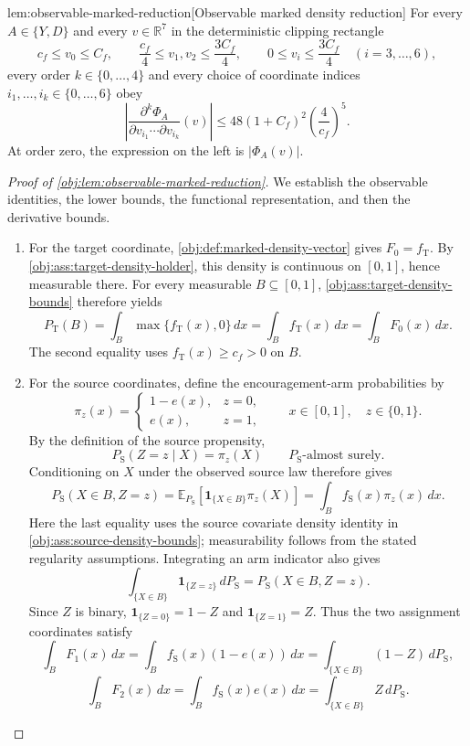 \documentclass[11pt]{article}
\begin{document}
\begin{lemmav}{lem:observable-marked-reduction}[Observable marked density reduction]
For every \(A\in\{Y,D\}\) and every \(v\in\mathbb R^7\) in the deterministic clipping rectangle
\[
c_f\le v_0\le C_f,\qquad
\frac{c_f}{4}\le v_1,v_2\le\frac{3C_f}{4},\qquad
0\le v_i\le\frac{3C_f}{4}\quad(i=3,\ldots,6),
\]
every order \(k\in\{0,\ldots,4\}\) and every choice of coordinate indices \(i_1,\ldots,i_k\in\{0,\ldots,6\}\) obey
\[
\left|
\frac{\partial^k\Phi_A}{\partial v_{i_1}\cdots\partial v_{i_k}}(v)
\right|
\le
48(1+C_f)^2\left(\frac{4}{c_f}\right)^5.
\]
At order zero, the expression on the left is \(\lvert\Phi_A(v)\rvert\).
\end{lemmav}

\begin{proof}[Proof of \cref{obj:lem:observable-marked-reduction}]
We establish the observable identities, the lower bounds, the functional representation, and then the derivative bounds.

\begin{enumerate}
\item For the target coordinate, \cref{obj:def:marked-density-vector} gives \(F_0=f_{\mathrm T}\). By \cref{obj:ass:target-density-holder}, this density is continuous on \([0,1]\), hence measurable there. For every measurable \(B\subseteq[0,1]\), \cref{obj:ass:target-density-bounds} therefore yields
\[
P_{\mathrm T}(B)
=\int_B\max\{f_{\mathrm T}(x),0\}\,dx
=\int_B f_{\mathrm T}(x)\,dx
=\int_B F_0(x)\,dx.
\]
The second equality uses \(f_{\mathrm T}(x)\ge c_f>0\) on \(B\).

\item For the source coordinates, define the encouragement-arm probabilities by
\[
\pi_z(x)=
\begin{cases}
1-e(x),&z=0,\\
e(x),&z=1,
\end{cases}
\qquad x\in[0,1],\quad z\in\{0,1\}.
\]
By the definition of the source propensity,
\[
P_{\mathrm S}(Z=z\mid X)=\pi_z(X)
\qquad P_{\mathrm S}\text{-almost surely}.
\]
Conditioning on \(X\) under the observed source law therefore gives
\[
P_{\mathrm S}(X\in B,Z=z)
=
\mathbb E_{P_{\mathrm S}}\!\left[
\mathbf 1_{\{X\in B\}}\pi_z(X)
\right]
=
\int_B f_{\mathrm S}(x)\pi_z(x)\,dx.
\]
Here the last equality uses the source covariate density identity in
\cref{obj:ass:source-density-bounds}; measurability follows from the stated regularity assumptions. Integrating an arm indicator also gives
\[
\int_{\{X\in B\}}\mathbf 1_{\{Z=z\}}\,dP_{\mathrm S}
=P_{\mathrm S}(X\in B,Z=z).
\]
Since \(Z\) is binary, \(\mathbf 1_{\{Z=0\}}=1-Z\) and
\(\mathbf 1_{\{Z=1\}}=Z\). Thus the two assignment coordinates satisfy
\[
\int_B F_1(x)\,dx
=\int_B f_{\mathrm S}(x)(1-e(x))\,dx
=\int_{\{X\in B\}}(1-Z)\,dP_{\mathrm S},
\]
\[
\int_B F_2(x)\,dx
=\int_B f_{\mathrm S}(x)e(x)\,dx
=\int_{\{X\in B\}}Z\,dP_{\mathrm S}.
\]


\end{enumerate}
\end{proof}
\end{document}
